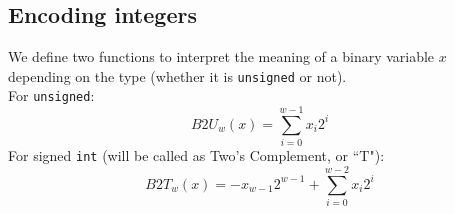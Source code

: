 \documentclass{article}
\newcommand{\ms}[1]{\texttt{#1}}
\begin{document}
\subsection{Encoding integers}
We define two functions to interpret the meaning of a binary variable $x$ depending on the type (whether it is \ms{unsigned} or not).\\
For \ms{unsigned}:\\
\begin{equation*}
B2U_{w}(x) = \sum_{i=0}^{w-1} x_i 2^i 
\end{equation*}
For signed \ms{int} (will be called as Two's Complement, or ``T"):\\
\begin{equation*}
B2T_{w}(x) = -x_{w-1}2^{w-1} + \sum_{i=0}^{w-2} x_i 2^i 
\end{equation*}
\end{document}
